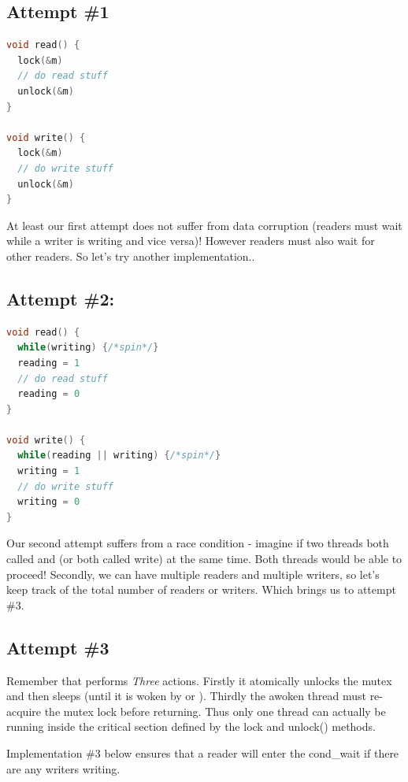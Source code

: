 \subsection{Attempt \#1}\label{attempt-1}

\begin{lstlisting}[language=C]
void read() {
  lock(&m)
  // do read stuff
  unlock(&m)
}

void write() {
  lock(&m)
  // do write stuff
  unlock(&m)
}
\end{lstlisting}

At least our first attempt does not suffer from data corruption (readers must wait while a writer is writing and vice versa)! However readers must also wait for other readers. So let's try another implementation..

\subsection{Attempt \#2:}\label{attempt-2}

\begin{lstlisting}[language=C]
void read() {
  while(writing) {/*spin*/}
  reading = 1
  // do read stuff
  reading = 0
}

void write() {
  while(reading || writing) {/*spin*/}
  writing = 1
  // do write stuff
  writing = 0
}
\end{lstlisting}

Our second attempt suffers from a race condition - imagine if two threads both called  and  (or both called write) at the same time. Both threads would be able to proceed! Secondly, we can have multiple readers and multiple writers, so let's keep track of the total number of readers or writers. Which brings us to attempt \#3.

\subsection{Attempt \#3}\label{attempt-3}

Remember that  performs \emph{Three} actions. Firstly it atomically unlocks the mutex and then sleeps (until it is woken by  or ). Thirdly the awoken thread must re-acquire the mutex lock before returning. Thus only one thread can actually be running inside the critical section defined by the lock and unlock() methods.

Implementation \#3 below ensures that a reader will enter the cond\_wait if there are any writers writing.

